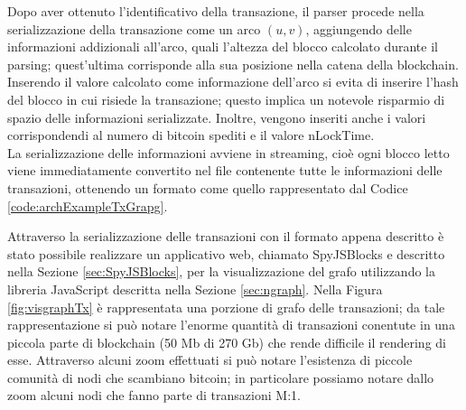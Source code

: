 \begin{example}
Dopo aver ottenuto l'identificativo della transazione, il parser procede nella serializzazione della transazione come un arco $(u, v)$, aggiungendo delle informazioni addizionali all'arco, quali  l'altezza del blocco calcolato durante il parsing; quest'ultima corrisponde alla sua posizione nella catena della blockchain.
Inserendo il valore calcolato come informazione dell'arco si evita di inserire l'hash del blocco in cui risiede la transazione; questo implica un notevole risparmio di spazio delle informazioni serializzate. Inoltre, vengono inseriti anche i valori corrispondendi al numero di bitcoin spediti e il valore nLockTime.\\
La serializzazione delle informazioni avviene in streaming, cioè ogni blocco letto viene immediatamente convertito nel file contenente tutte le informazioni delle transazioni, ottenendo un formato come quello rappresentato dal Codice \ref{code:archExampleTxGrapg}.\\



\end{example}

Attraverso la serializzazione delle transazioni con il formato appena descritto è stato possibile realizzare un applicativo web, chiamato SpyJSBlocks e descritto nella Sezione \ref{sec:SpyJSBlocks}, per la visualizzazione del grafo utilizzando la libreria JavaScript descritta nella Sezione \ref{sec:ngraph}. Nella Figura \ref{fig:visgraphTx} è rappresentata una porzione di grafo delle transazioni; da tale rappresentazione si può notare  l'enorme quantità di transazioni conentute in una piccola parte di blockchain (50 Mb di 270 Gb) che rende difficile il rendering di esse.
Attraverso alcuni zoom effettuati si può notare l'esistenza di piccole comunità di nodi che scambiano bitcoin; in particolare possiamo notare dallo zoom  alcuni nodi che fanno parte di transazioni M:1.

